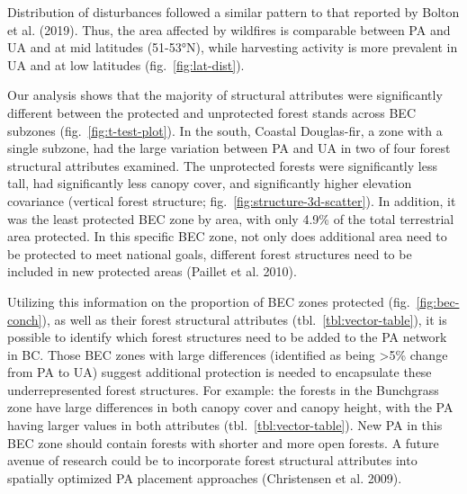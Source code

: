 \documentclass[11pt]{article}
\begin{document}
Distribution of disturbances followed a similar pattern to that reported
by Bolton et al. (2019). Thus, the area affected by wildfires is
comparable between PA and UA and at mid latitudes (51-53°N), while
harvesting activity is more prevalent in UA and at low latitudes
(fig.~\ref{fig:lat-dist}).

Our analysis shows that the majority of structural attributes were
significantly different between the protected and unprotected forest
stands across BEC subzones (fig.~\ref{fig:t-test-plot}). In the south,
Coastal Douglas-fir, a zone with a single subzone, had the large
variation between PA and UA in two of four forest structural attributes
examined. The unprotected forests were significantly less tall, had
significantly less canopy cover, and significantly higher elevation
covariance (vertical forest structure;
fig.~\ref{fig:structure-3d-scatter}). In addition, it was the least
protected BEC zone by area, with only 4.9\% of the total terrestrial
area protected. In this specific BEC zone, not only does additional area
need to be protected to meet national goals, different forest structures
need to be included in new protected areas (Paillet et al. 2010).

Utilizing this information on the proportion of BEC zones protected
(fig.~\ref{fig:bec-conch}), as well as their forest structural
attributes (tbl.~\ref{tbl:vector-table}), it is possible to identify
which forest structures need to be added to the PA network in BC. Those
BEC zones with large differences (identified as being \textgreater5\%
change from PA to UA) suggest additional protection is needed to
encapsulate these underrepresented forest structures. For example: the
forests in the Bunchgrass zone have large differences in both canopy
cover and canopy height, with the PA having larger values in both
attributes (tbl.~\ref{tbl:vector-table}). New PA in this BEC zone should
contain forests with shorter and more open forests. A future avenue of
research could be to incorporate forest structural attributes into
spatially optimized PA placement approaches (Christensen et al. 2009).
\end{document}
